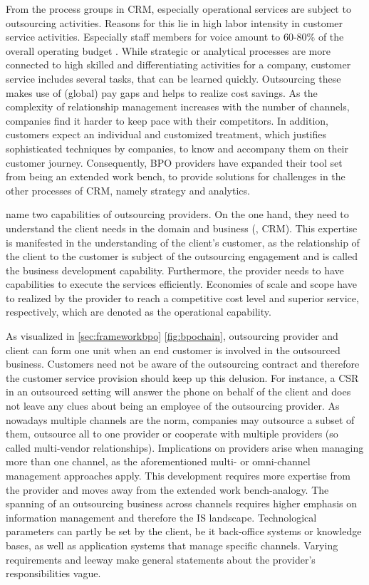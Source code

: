 		From the process groups in \acrshort{CRM}, especially operational services are subject to outsourcing activities. Reasons for this lie in high labor intensity in customer service activities. Especially staff members for voice amount to 60-80\% of the overall operating budget \cite{Aksin_2009}.   While strategic or analytical processes are more connected to high skilled and differentiating activities for a company, customer service includes several tasks, that can be learned quickly. Outsourcing these makes use of (global) pay gaps and helps to realize cost savings. As the complexity of relationship management increases with the number of channels, companies find it harder to keep pace with their competitors. In addition, customers expect an individual and customized treatment, which justifies sophisticated techniques by companies, to know and accompany them on their customer journey. Consequently, BPO providers have expanded their tool set from being an extended work bench, to provide solutions for challenges in the other processes of CRM, namely strategy and analytics. 
		
		\citeauthor{Ramachandran2004} name two capabilities of outsourcing providers. On the one hand, they need to understand the client needs in the domain and business (\eg, CRM). This expertise is manifested in the understanding of the client's customer, as the relationship of the client to the customer is subject of the outsourcing engagement and is called the business development capability. Furthermore, the provider needs to have capabilities to execute the services efficiently. Economies of scale and scope have to realized by the provider to reach a competitive cost level and superior service, respectively, which are denoted as the operational capability.
		
		As visualized in  \ref{sec:frameworkbpo} \Fig \ref{fig:bpochain}, outsourcing provider and client can form one unit when an end customer is involved in the outsourced business. Customers need not be aware of the outsourcing contract and therefore the customer service provision should keep up this delusion. For instance, a \acrshort{CSR} in an outsourced setting will answer the phone on behalf of the client and does not leave any clues about being an employee of the outsourcing provider. As nowadays multiple channels are the norm, companies may outsource a subset of them, outsource all to one provider or cooperate with multiple providers (so called multi-vendor relationships). Implications on providers arise when managing more than one channel, as the aforementioned multi- or omni-channel management approaches apply. This development requires more expertise from the provider and moves away from the extended work bench-analogy. The spanning of an outsourcing business across channels requires higher emphasis on information management and therefore the \acrshort{IS} landscape. Technological parameters can partly be set by the client, be it back-office systems or knowledge bases, as well as application systems that manage specific channels. Varying requirements and leeway make general statements about the provider's responsibilities vague. 
		
